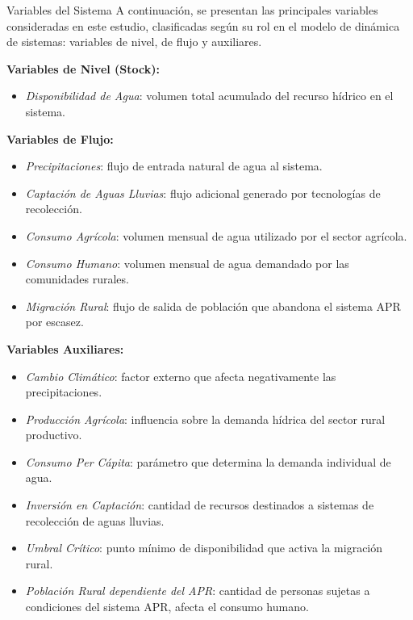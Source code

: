 \documentclass[aspectratio=169]{beamer}
\begin{document}
\begin{frame}{Variables del Sistema}
A continuación, se presentan las principales variables consideradas en este estudio, clasificadas según su rol en el modelo de dinámica de sistemas: variables de nivel, de flujo y auxiliares.

\textbf{Variables de Nivel (Stock):}
\begin{itemize}
    \item \textit{Disponibilidad de Agua}: volumen total acumulado del recurso hídrico en el sistema.
\end{itemize}

\textbf{Variables de Flujo:}
\begin{itemize}
    \item \textit{Precipitaciones}: flujo de entrada natural de agua al sistema.
    \item \textit{Captación de Aguas Lluvias}: flujo adicional generado por tecnologías de recolección.
    \item \textit{Consumo Agrícola}: volumen mensual de agua utilizado por el sector agrícola.
    \item \textit{Consumo Humano}: volumen mensual de agua demandado por las comunidades rurales.
    \item \textit{Migración Rural}: flujo de salida de población que abandona el sistema APR por escasez.
\end{itemize}

\textbf{Variables Auxiliares:}
\begin{itemize}
    \item \textit{Cambio Climático}: factor externo que afecta negativamente las precipitaciones.
    \item \textit{Producción Agrícola}: influencia sobre la demanda hídrica del sector rural productivo.
    \item \textit{Consumo Per Cápita}: parámetro que determina la demanda individual de agua.
    \item \textit{Inversión en Captación}: cantidad de recursos destinados a sistemas de recolección de aguas lluvias.
    \item \textit{Umbral Crítico}: punto mínimo de disponibilidad que activa la migración rural.
    \item \textit{Población Rural dependiente del APR}: cantidad de personas sujetas a condiciones del sistema APR, afecta el consumo humano.
\end{itemize}
\end{frame}
\end{document}
